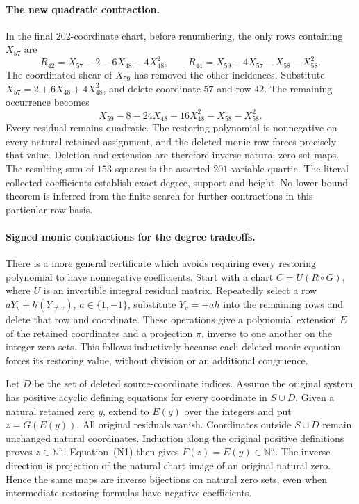 \paragraph{The new quadratic contraction.}
In the final $202$-coordinate chart, before renumbering, the only rows
containing $X_{57}$ are
\[
 R_{42}=X_{57}-2-6X_{48}-4X_{48}^{2},\qquad
 R_{44}=X_{59}-4X_{57}-X_{58}-X_{58}^{2}.
\]
The coordinated shear of $X_{59}$ has removed the other incidences.
Substitute $X_{57}=2+6X_{48}+4X_{48}^{2}$, and delete coordinate $57$
and row $42$. The remaining occurrence becomes
\[
 X_{59}-8-24X_{48}-16X_{48}^{2}-X_{58}-X_{58}^{2}.
\]
Every residual remains quadratic. The restoring polynomial is nonnegative
on every natural retained assignment, and the deleted monic row forces
precisely that value. Deletion and extension are therefore inverse natural
zero-set maps. The resulting sum of $153$ squares is the asserted
$201$-variable quartic. The literal collected coefficients establish exact
degree, support and height. No lower-bound theorem is inferred from the
finite search for further contractions in this particular row basis.

\paragraph{Signed monic contractions for the degree tradeoffs.}
There is a more general certificate which avoids requiring every restoring
polynomial to have nonnegative coefficients. Start with a chart
$C=U(R\circ G)$, where $U$ is an invertible integral residual matrix.
Repeatedly select a row $aY_v+h(Y_{\ne v})$, $a\in\{1,-1\}$, substitute
$Y_v=-ah$ into the remaining rows and delete that row and coordinate.
These operations give a polynomial extension $E$ of the retained coordinates
and a projection $\pi$, inverse to one another on the integer zero sets.
This follows inductively because each deleted monic equation forces its
restoring value, without division or an additional congruence.

Let $D$ be the set of deleted source-coordinate indices. Assume the original
system has positive acyclic defining equations for every coordinate in
$S\cup D$. Given a natural retained zero $y$, extend to $E(y)$ over the
integers and put $z=G(E(y))$. All original residuals vanish. Coordinates
outside $S\cup D$ remain unchanged natural coordinates. Induction along
the original positive definitions proves $z\in\mathbb N^n$. Equation~(N1)
then gives $F(z)=E(y)\in\mathbb N^n$. The inverse direction is projection
of the natural chart image of an original natural zero. Hence the same
maps are inverse bijections on natural zero sets, even when intermediate
restoring formulas have negative coefficients.

